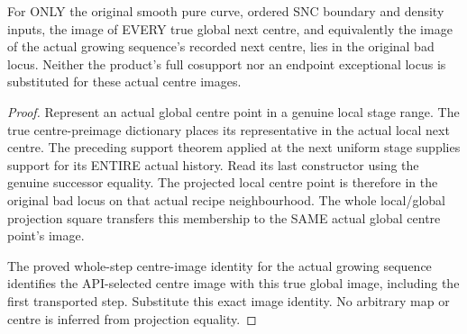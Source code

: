 \begin{theorem}
\label{hir:sharp-actual-curve-growing-centre-images-over-original-bad}
\leanok
For ONLY the original smooth pure curve, ordered SNC boundary and density
inputs, the image of EVERY true global next centre, and equivalently the
image of the actual growing sequence's recorded next centre, lies in the
original bad locus. Neither the product's full cosupport nor an endpoint
exceptional locus is substituted for these actual centre images.
\end{theorem}
\begin{proof}
Represent an actual global centre point in a genuine local stage range.
The true centre-preimage dictionary places its representative in the
actual local next centre. The preceding support theorem applied at the
next uniform stage supplies support for its ENTIRE actual history. Read
its last constructor using the genuine successor equality. The projected
local centre point is therefore in the original bad locus on that actual
recipe neighbourhood. The whole local/global projection square transfers
this membership to the SAME actual global centre point's image.

The proved whole-step centre-image identity for the actual growing
sequence identifies the API-selected centre image with this true global
image, including the first transported step. Substitute this exact image
identity. No arbitrary map or centre is inferred from projection equality.
\end{proof}

